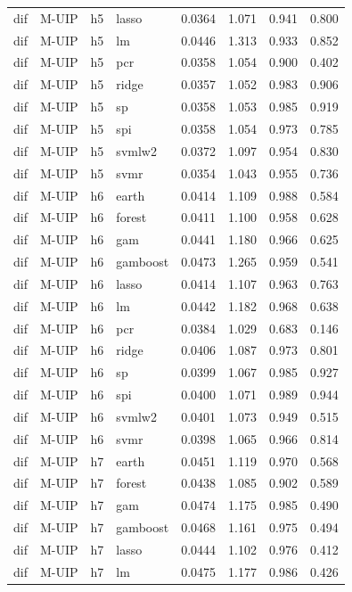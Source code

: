 \begin{ThreePartTable}
\begin{longtable}[t]{llclcccc}
dif & M-UIP & h5 & lasso & 0.0364 & 1.071 & 0.941 & 0.800\\
dif & M-UIP & h5 & lm & 0.0446 & 1.313 & 0.933 & 0.852\\
dif & M-UIP & h5 & pcr & 0.0358 & 1.054 & 0.900 & 0.402\\
dif & M-UIP & h5 & ridge & 0.0357 & 1.052 & 0.983 & 0.906\\
dif & M-UIP & h5 & sp & 0.0358 & 1.053 & 0.985 & 0.919\\
dif & M-UIP & h5 & spi & 0.0358 & 1.054 & 0.973 & 0.785\\
dif & M-UIP & h5 & svmlw2 & 0.0372 & 1.097 & 0.954 & 0.830\\
dif & M-UIP & h5 & svmr & 0.0354 & 1.043 & 0.955 & 0.736\\
\addlinespace
dif & M-UIP & h6 & earth & 0.0414 & 1.109 & 0.988 & 0.584\\
dif & M-UIP & h6 & forest & 0.0411 & 1.100 & 0.958 & 0.628\\
dif & M-UIP & h6 & gam & 0.0441 & 1.180 & 0.966 & 0.625\\
dif & M-UIP & h6 & gamboost & 0.0473 & 1.265 & 0.959 & 0.541\\
dif & M-UIP & h6 & lasso & 0.0414 & 1.107 & 0.963 & 0.763\\
dif & M-UIP & h6 & lm & 0.0442 & 1.182 & 0.968 & 0.638\\
dif & M-UIP & h6 & pcr & 0.0384 & 1.029 & 0.683 & 0.146\\
dif & M-UIP & h6 & ridge & 0.0406 & 1.087 & 0.973 & 0.801\\
dif & M-UIP & h6 & sp & 0.0399 & 1.067 & 0.985 & 0.927\\
dif & M-UIP & h6 & spi & 0.0400 & 1.071 & 0.989 & 0.944\\
dif & M-UIP & h6 & svmlw2 & 0.0401 & 1.073 & 0.949 & 0.515\\
dif & M-UIP & h6 & svmr & 0.0398 & 1.065 & 0.966 & 0.814\\
\addlinespace
dif & M-UIP & h7 & earth & 0.0451 & 1.119 & 0.970 & 0.568\\
dif & M-UIP & h7 & forest & 0.0438 & 1.085 & 0.902 & 0.589\\
dif & M-UIP & h7 & gam & 0.0474 & 1.175 & 0.985 & 0.490\\
dif & M-UIP & h7 & gamboost & 0.0468 & 1.161 & 0.975 & 0.494\\
dif & M-UIP & h7 & lasso & 0.0444 & 1.102 & 0.976 & 0.412\\
dif & M-UIP & h7 & lm & 0.0475 & 1.177 & 0.986 & 0.426\\

\end{longtable}
\end{ThreePartTable}
